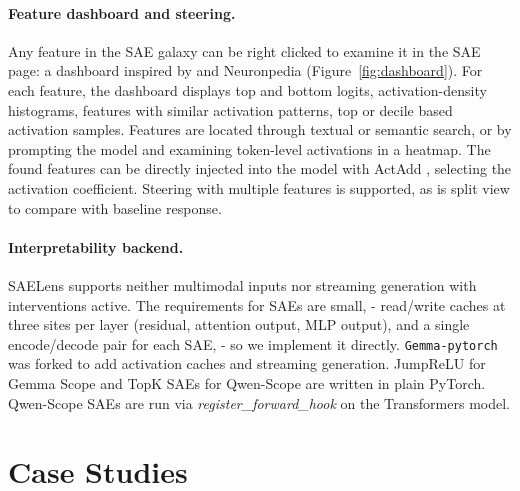 \documentclass[11pt]{article}
\begin{document}
\paragraph{Feature dashboard and steering.}
Any feature in the SAE galaxy can be right clicked to examine it in the SAE page: a dashboard inspired by \citet{bricken2023monosemanticity} and Neuronpedia \cite{neuronpedia}(Figure~\ref{fig:dashboard}). For each feature, the dashboard displays top and bottom logits, activation-density histograms, features with similar activation patterns, top or decile based activation samples. Features are located through textual or semantic search, or by prompting the model and examining token-level activations in a heatmap. The found features can be directly injected into the model with ActAdd \cite{turner2024steeringlanguagemodelsactivation}, selecting the activation coefficient. Steering with multiple features is supported, as is split view to compare with baseline response. 


\paragraph{Interpretability backend.}

SAELens \cite{bloom2024saetrainingcodebase} supports neither multimodal inputs nor streaming generation with interventions active. The requirements for SAEs are small, - read/write caches at three sites per layer (residual, attention output, MLP output), and a single encode/decode pair for each SAE, - so we implement it directly. \texttt{Gemma-pytorch} was forked to add activation caches and streaming generation. JumpReLU \cite{rajamanoharan2024jumpingaheadimprovingreconstruction} for Gemma Scope and TopK \cite{gao2024scalingevaluatingsparseautoencoders} SAEs for Qwen-Scope \cite{deng2026qwenscopeturningsparsefeatures} are written in plain PyTorch. Qwen-Scope SAEs are run via \textit{register\_forward\_hook} on the Transformers model.


\section{Case Studies}
\label{sec:cases}
\end{document}
